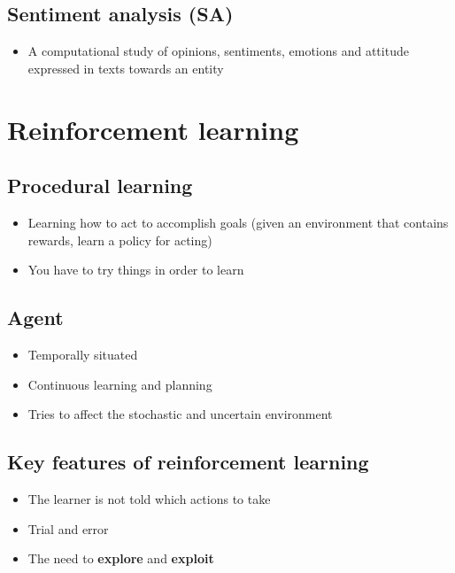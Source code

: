 \documentclass{article}
\begin{document}
    \subsection{Sentiment analysis (SA)}
    \begin{itemize}
        \item A computational study of opinions, sentiments, emotions and attitude expressed in texts towards an entity
    \end{itemize}

    \newpage

\section{Reinforcement learning}
    \subsection{Procedural learning}
    \begin{itemize}
        \item Learning how to act to accomplish goals (given an environment that contains rewards, learn a policy for acting)
        \item You have to try things in order to learn
    \end{itemize}

    \subsection{Agent}
    \begin{itemize}
        \item Temporally situated
        \item Continuous learning and planning
        \item Tries to affect the stochastic and uncertain environment
    \end{itemize}

    \subsection{Key features of reinforcement learning}
    \begin{itemize}
        \item The learner is not told which actions to take
        \item Trial and error
        \item The need to \textbf{explore} and \textbf{exploit}
    \end{itemize}
\end{document}
